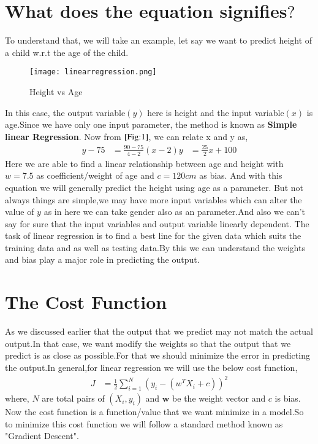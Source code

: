 \documentclass[journal,12pt,onecolumn]{IEEEtran}
\providecommand{\brak}[1]{\ensuremath{\left(#1\right)}}
\theoremstyle{remark}
\numberwithin{equation}{section}
\let\vec\mathbf
\begin{document}
  \section{What does the equation signifies$?$}
   To understand that, we will take an example, let say we want to predict height of a child w.r.t the age of the child.
    \begin{figure}
     \centering
     \texttt{[image: linearregression.png]}
     \caption{Height vs Age}
     \label{Fig:1}
    \end{figure}
    In this case, the output variable$\brak{y}$ here is height and the input variable$\brak{x}$ is age.Since we have only one input parameter, the method is known as \textbf{Simple linear Regression}.
    Now from $\ref{Fig:1}$, we can relate x and y as,
      \begin{align}
	      y - 75 &= \frac{90-75}{4-2}\brak{x-2}
	      y &= \frac{25}{2}x + 100
      \end{align}
    Here we are able to find a linear relationship between age and height with $w = 7.5$ as coefficient/weight of age and $c = 120cm$ as bias. And with this equation we
    will generally predict the height using age as a parameter. But not always things are simple,we may have more input variables which can alter the value of $y$ as in here we can take gender also as an parameter.And also we can't say for sure that the input variables and output variable linearly dependent. The task of linear regression is to find a best line for the given data which suits the training data and as well as testing data.By this we can understand
    the weights and bias play a major role in predicting the output.
   \section{The Cost Function}
    As we discussed earlier that the output that we predict may not match the actual output.In that case, we want modify the weights so that the output that we predict is as close as possible.For that we should minimize the error in predicting the output.In general,for linear regression we will use the below cost function,
                \begin{align}
			J &= \frac{1}{2}\sum_{i=1}^{N}\brak{y_{i}-\brak{w^TX_{i}+c}}^{2}
		\end{align}
	where, $N$ are total pairs of $\brak{X_{i},y_{i}}$ and $\vec{w}$ be the weight vector and $c$ is bias.
  Now the cost function is a function/value that we want minimize in a model.So to minimize this cost function we will follow a standard method known as "Gradient Descent".
\end{document}
